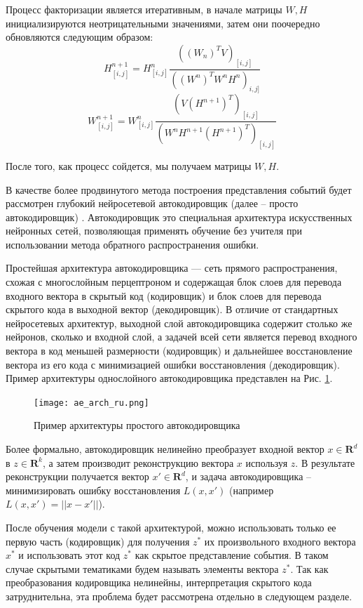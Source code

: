 Процесс факторизации является итеративным, в начале матрицы $W, H$ инициализируются неотрицательными значениями, затем они поочередно обновляются следующим образом:
$$H^{n+1}_{[i,j]} = H^n_{[i,j]} \frac{((W_n)^TV)_{[i,j]}}{((W^n)^TW^nH^n)_{i,j]}}$$
$$W^{n+1}_{[i,j]} = W^n_{[i,j]} \frac{(V(H^{n+1})^T)_{[i,j]}}{(W^nH^{n+1}(H^{n+1})^T)_{[i,j]}}$$

После того, как процесс сойдется, мы получаем матрицы $W,H$.

В качестве более продвинутого метода построения представления событий будет рассмотрен глубокий нейросетевой автокодировщик (далее -- просто автокодировщик) \cite{ae_orig}. 
Автокодировщик это специальная архитектура искусственных нейронных сетей, позволяющая применять обучение без учителя при использовании метода обратного распространения ошибки.

Простейшая архитектура автокодировщика — сеть прямого распространения, схожая с многослойным перцептроном и содержащая блок слоев для перевода входного вектора в скрытый код (кодировщик) и блок слоев для перевода скрытого кода в выходной вектор (декодировщик). В отличие от стандартных нейросетевых архитектур, выходной слой автокодировщика содержит столько же нейронов, сколько и входной слой, а задачей всей сети является перевод входного вектора в код меньшей размерности (кодировщик) и дальнейшее восстановление вектора из его кода с минимизацией ошибки восстановления (декодировщик). Пример архитектуры однослойного автокодировщика представлен на Рис. \ref{fig:ae_arch}.
\begin{figure}
\centering
  \texttt{[image: ae\_arch\_ru.png]}
  \caption{Пример архитектуры простого автокодировщика}
  \label{fig:ae_arch}
\end{figure}

Более формально, автокодировщик нелинейно преобразует входной вектор $x \in \mathbf{R}^d$ в $z \in \mathbf{R}^k$, а затем производит реконструкцию вектора $x$ используя $z$. В результате реконструкции получается вектор $x' \in \mathbf{R}^d$, и задача автокодировщика -- минимизировать ошибку восстановления $L(x,x')$ (например $L(x,x')=||x - x'||$).

После обучения модели с такой архитектурой, можно использовать только ее первую часть (кодировщик) для получения $z^*$ их произвольного входного вектора $x^*$ и использовать этот код $z^*$ как скрытое представление события. В таком случае скрытыми тематиками будем называть элементы вектора $z^*$.
Так как преобразования кодировщика нелинейны, интерпретация скрытого кода затруднительна, эта проблема будет рассмотрена отдельно в следующем разделе.

